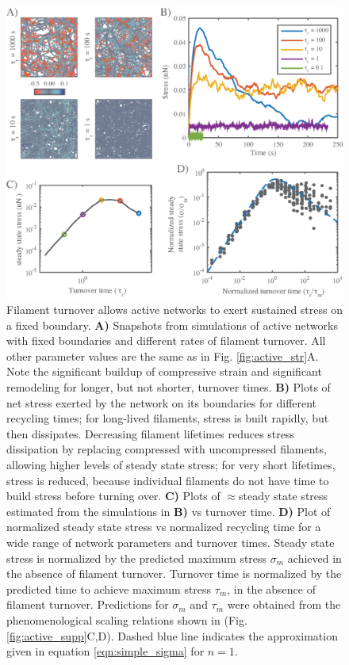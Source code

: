 \begin{figure}[h!]
	\centering
	\includegraphics[width=\hsize]{active/figures/Fig7}
	\caption{\label{fig:active_rec} Filament turnover allows active networks to exert sustained stress on a fixed boundary. \textbf{A)} Snapshots from simulations of active networks with fixed boundaries and different rates of filament turnover.  All other parameter values are the same as in Fig. \ref{fig:active_str}A. Note the significant buildup of compressive strain and significant remodeling for longer, but not shorter, turnover times. \textbf{B)} Plots of net stress exerted by the network on its boundaries for different recycling times; for long-lived filaments, stress is built rapidly, but then dissipates. Decreasing filament lifetimes reduces stress dissipation by replacing compressed with uncompressed filaments, allowing higher levels of steady state stress; for very short lifetimes, stress is reduced, because individual filaments do not have time to build stress before turning over. \textbf{C)} Plots of $\approx$steady state stress estimated from the simulations in \textbf{B)} vs turnover time.  \textbf{D)} Plot of normalized steady state stress vs normalized recycling time for a wide range of network parameters and turnover times.  Steady state stress is normalized by the predicted maximum stress $\sigma_{m}$ achieved in the absence of filament turnover.  Turnover time is normalized by the predicted time to achieve maximum stress $\tau_{m}$, in the absence of filament turnover.  Predictions for $\sigma_{m}$ and $\tau_{m}$  were obtained from the phenomenological scaling relations shown in (Fig. \ref{fig:active_supp}C,D). Dashed blue line indicates the approximation given in equation \ref{eqn:simple_sigma} for $n=1$.}
\end{figure}

